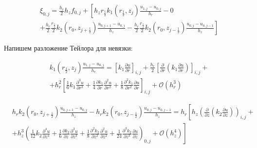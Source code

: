 \begin{align*}
  &\xi_{0, j} = \frac{h_r}{2} h_z f_{0, j} + \left [ 
    h_z r_{\frac{1}{2}} k_1(r_{\frac{1}{2}}, z_j) \frac{u_{1, j} - u_{0, j}}{h_{r}}
    - 0
    \right . \\
    &\left .
    + \frac{h_r}{2} \frac{r_{\frac{1}{2}}}{2} k_2(r_0, z_{j+\frac{1}{2}}) \frac{u_{0, j + 1} - u_{0, j}}{h_{z}}
    - \frac{h_r}{2} \frac{r_{\frac{1}{2}}}{2} k_2(r_0, z_{j-\frac{1}{2}}) \frac{u_{0, j} - u_{0, j - 1}}{h_z}
    \right ]
\end{align*}

Напишем разложение Тейлора для невязки:

\begin{align*}
  &k_1(r_\frac{1}{2}, z_j) \frac{u_{1, j} - u_{0, j}}{h_r} = \left[ k_1 \frac{\partial u}{ \partial r} \right]_{i, j}
  + \frac{h_r}{2} \left[ \frac{\partial }{ \partial r} \left( k_1 \frac{\partial u}{ \partial r} \right) \right]_{i, j} + \\
  &+ h^2_r \left[
    \frac{1}{6}k_1 \frac{\partial^3 u}{ \partial r^3} +
    \frac{1}{4} \frac{\partial k_1}{ \partial r} \frac{\partial^2 u}{ \partial r^2} +
    \frac{1}{8} \frac{\partial^2 k_1}{ \partial r^2} \frac{\partial u}{ \partial r}
  \right]_{i ,j} + \mathcal{O}(h^3_r)
\end{align*}

\begin{align*}
  &h_r k_2(r_0, z_{j + \frac{1}{2}}) \frac{u_{0, j + 1} - u_{0, j}}{h_z} -
  h_r k_2(r_0, z_{j - \frac{1}{2}}) \frac{u_{0, j} - u_{0, j - 1}}{h_z} =
  h_r \left[ h_z \left( \frac{\partial }{ \partial z} \left( k_2 \frac{\partial u}{ \partial z} \right) \right)_{i, j} \right. + \\
  &\left. + h^3_z \left( 
    \frac{1}{12}k_2 \frac{\partial^4 u}{ \partial z^4}  +
    \frac{1}{6} \frac{\partial k_2}{ \partial z} \frac{\partial^3 u}{ \partial z^3} +
    \frac{1}{8} \frac{\partial^2 k_2}{ \partial z^2} \frac{\partial^2 u}{ \partial z^2} +
    \frac{1}{24} \frac{\partial^3 k_2}{ \partial z^3} \frac{\partial u}{ \partial z} \right)_{0, j}
    + \mathcal{O}(h^4_z)
  \right]
\end{align*}

